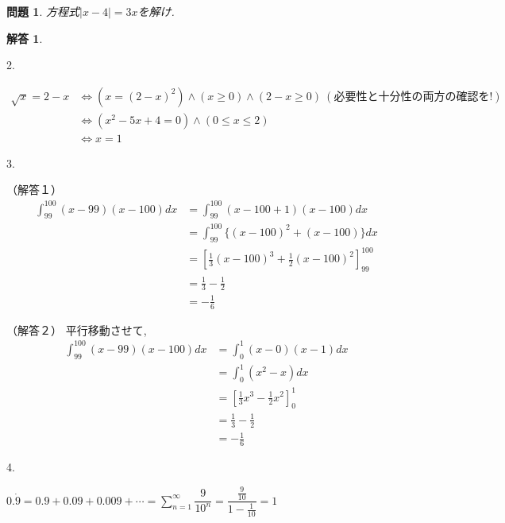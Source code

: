 \documentclass[dvipdfmx]{jsarticle} %
\newtheorem{question}{問題}
\newtheorem*{answer*}{解答}
\begin{document}
\begin{question}
 方程式$|x-4| = 3x$を解け. 
\end{question}

\vspace{10zw}

\begin{answer*}
\end{answer*}

2. 

\bigskip

$\begin{aligned}
  \sqrt{x} = 2 - x 
  &\Longleftrightarrow (x = (2-x)^2) \land (x \geq 0) \land (2-x \geq 0) \ (必要性と十分性の両方の確認を!)\\
  &\Longleftrightarrow (x^2 -5x + 4 = 0) \land (0 \leq x \leq 2) \\
  &\Longleftrightarrow x = 1
\end{aligned}$

\bigskip

3.

（解答１）
$$
\begin{aligned}
  \displaystyle \int_{99}^{100} (x-99)(x-100) dx
  &= \displaystyle \int_{99}^{100} (x-100+1)(x-100) dx \\
  &= \displaystyle \int_{99}^{100} \{(x-100)^2 + (x-100) \} dx \\
  &= \left[\frac{1}{3} (x-100)^3 + \frac{1}{2} (x-100)^2 \right]_{99}^{100} \\
  &= \frac{1}{3} - \frac{1}{2} \\
  &= -\frac{1}{6}
\end{aligned}
$$

（解答２）
平行移動させて, \ 
$$
\begin{aligned}
  \displaystyle \int_{99}^{100} (x-99)(x-100) dx
  &= \displaystyle \int_0^1 (x-0)(x-1) dx \\
  &= \displaystyle \int_0^1 (x^2 - x) dx \\
  &= \left[\frac{1}{3} x^3 - \frac{1}{2} x^2 \right]_0^1 \\
  &= \frac{1}{3} - \frac{1}{2} \\
  &= -\frac{1}{6}
\end{aligned}
$$

\bigskip

4.

\bigskip

$0.\dot{9} = 0.9 + 0.09 + 0.009 + \dotsb 
= \displaystyle \sum_{n=1}^{\infty} \dfrac{9}{10^n}
= \dfrac{\frac{9}{10}}{1-\frac{1}{10}}
= 1$
\end{document}
